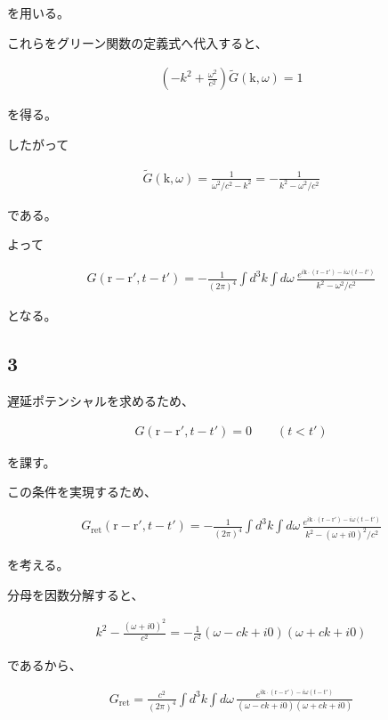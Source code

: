 \documentclass[platex,dvipdfmx,a4paper]{jsarticle}
\newcommand{\vect}[1]{\boldsymbol{\mathrm{#1}}}
\begin{document}
を用いる。

これらをグリーン関数の定義式へ代入すると、

\begin{align*}
\left(
-k^2+\frac{\omega^2}{c^2}
\right)
\widetilde G(\vect k,\omega)
=
1
\end{align*}

を得る。

したがって

\begin{align*}
\widetilde G(\vect k,\omega)
=
\frac{1}
{\omega^2/c^2-k^2}
=
-\frac{1}
{k^2-\omega^2/c^2}
\end{align*}

である。

よって

\begin{align*}
G(\vect r-\vect r',t-t')
=
-\frac{1}{(2\pi)^4}
\int d^3k
\int d\omega\,
\frac{
e^{i\vect k\cdot(\vect r-\vect r')-i\omega(t-t')}
}{
k^2-\omega^2/c^2
}
\end{align*}

となる。

\subsection*{3}

遅延ポテンシャルを求めるため、

\begin{align*}
G(\vect r-\vect r',t-t')
=
0
\qquad
(t<t')
\end{align*}

を課す。

この条件を実現するため、

\begin{align*}
G_{\mathrm{ret}}(\vect r-\vect r',t-t')
=
-\frac{1}{(2\pi)^4}
\int d^3k
\int d\omega\,
\frac{
e^{i\vect k\cdot(\vect r-\vect r')-i\omega(t-t')}
}{
k^2-(\omega+i0)^2/c^2
}
\end{align*}

を考える。

分母を因数分解すると、

\begin{align*}
k^2-\frac{(\omega+i0)^2}{c^2}
=
-\frac{1}{c^2}
(\omega-ck+i0)
(\omega+ck+i0)
\end{align*}

であるから、

\begin{align*}
G_{\mathrm{ret}}
=
\frac{c^2}{(2\pi)^4}
\int d^3k
\int d\omega\,
\frac{
e^{i\vect k\cdot(\vect r-\vect r')-i\omega(t-t')}
}{
(\omega-ck+i0)
(\omega+ck+i0)
}
\end{align*}
\end{document}
